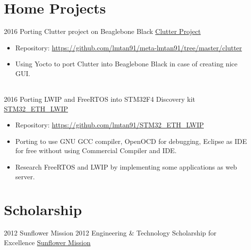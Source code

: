 \documentclass[letterpaper]{twentysecondcv} %
\begin{document}
\section{Home Projects}
\begin{twenty}
	\twentyitem
	{2016}
	{}
	{Porting Clutter project on Beaglebone Black}
	{\href{https://blogs.gnome.org/clutter/}{Clutter Project}}
	{}
	{
		{\begin{itemize}
		\item Repository: \url{https://github.com/lmtan91/meta-lmtan91/tree/master/clutter}
		\item Using Yocto to port Clutter into Beaglebone Black in case of creating nice GUI.
		\end{itemize}}
	}
	\\
	\twentyitem
	{2016}
	{}
	{Porting LWIP and FreeRTOS into STM32F4 Discovery kit}
	{\href{https://github.com/lmtan91/STM32\_ETH\_LWIP}{STM32\_ETH\_LWIP}}
	{}
	{
		{\begin{itemize}
		\item Repository: \url{https://github.com/lmtan91/STM32\_ETH\_LWIP}
		\item Porting to use GNU GCC compiler, OpenOCD for debugging, Eclipse as IDE for free without using Commercial Compiler and IDE.
		\item Research FreeRTOS and LWIP by implementing some applications as web server.
		\end{itemize}}
	}
\end{twenty}

\section{Scholarship}
\begin{twenty}
	\twentyitem
	{2012}
	{}
	{Sunflower Mission 2012 Engineering \& Technology Scholarship for Excellence}
	{\href{https://www.esilicon.com/company/careers/scholarships-in-vietnam}{Sunflower Mission}}
	{}
	
\end{twenty}
\end{document}
